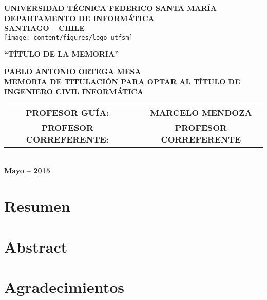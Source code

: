 \documentclass[letterpaper,12pt]{book}
\begin{document}
\begin{titlepage}
\begin{centering}
{
\textbf{\Large UNIVERSIDAD TÉCNICA FEDERICO SANTA MARÍA}\\[0em]
\textbf{\small DEPARTAMENTO DE INFORMÁTICA}\\[0em]
\textbf{\small SANTIAGO -- CHILE}\\[2.4em]
}
\texttt{[image: content/figures/logo-utfsm]} \\[4em]
\begin{spacing}{1.8}
\textbf{\Large \uppercase{``Título de la memoria''}}\\[3.70em]
\end{spacing}
\textbf{\large \uppercase{Pablo Antonio Ortega Mesa}}\\[0.54em]
\textbf{\small MEMORIA DE TITULACIÓN PARA OPTAR AL TÍTULO DE INGENIERO CIVIL INFORMÁTICA} \\[1em]
\begin{tabular}{ccc} \small\bf
\small\bf PROFESOR GUÍA:          & & \small\bf \uppercase{Marcelo Mendoza} \\
\small\bf PROFESOR CORREFERENTE:  & & \small\bf \uppercase{Profesor Correferente} \\
\end{tabular} \\[2.5em]
\textbf{\small Mayo -- 2015} \\
\end{centering}
\end{titlepage}



\section*{Resumen}

\clearpage

\section*{Abstract}

\clearpage

\section*{Agradecimientos}

\clearpage

\let\cleardoublepage\clearpage

\end{document}

